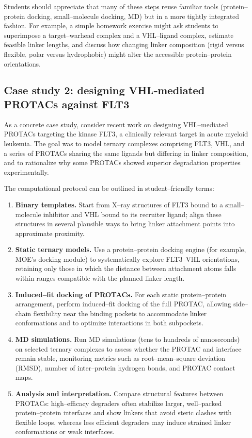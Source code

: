 \documentclass[12pt]{article}
\begin{document}
Students should appreciate that many of these steps reuse familiar tools (protein–protein docking, small–molecule docking, MD) but in a more tightly integrated fashion.  
For example, a simple homework exercise might ask students to superimpose a target–warhead complex and a VHL–ligand complex, estimate feasible linker lengths, and discuss how changing linker composition (rigid versus flexible, polar versus hydrophobic) might alter the accessible protein–protein orientations.

\subsection{Case study 2: designing VHL‐mediated PROTACs against FLT3}

As a concrete case study, consider recent work on designing VHL–mediated PROTACs targeting the kinase FLT3, a clinically relevant target in acute myeloid leukemia. 
The goal was to model ternary complexes comprising FLT3, VHL, and a series of PROTACs sharing the same ligands but differing in linker composition, and to rationalize why some PROTACs showed superior degradation properties experimentally.\cite{CH14_flt3protac2025} 

The computational protocol can be outlined in student–friendly terms:

\begin{enumerate}
  \item \textbf{Binary templates.} Start from X–ray structures of FLT3 bound to a small–molecule inhibitor and VHL bound to its recruiter ligand; align these structures in several plausible ways to bring linker attachment points into approximate proximity.  
  \item \textbf{Static ternary models.} Use a protein–protein docking engine (for example, MOE’s docking module) to systematically explore FLT3–VHL orientations, retaining only those in which the distance between attachment atoms falls within ranges compatible with the planned linker length.  
  \item \textbf{Induced–fit docking of PROTACs.} For each static protein–protein arrangement, perform induced–fit docking of the full PROTAC, allowing side–chain flexibility near the binding pockets to accommodate linker conformations and to optimize interactions in both subpockets.  
  \item \textbf{MD simulations.} Run MD simulations (tens to hundreds of nanoseconds) on selected ternary complexes to assess whether the PROTAC and interface remain stable, monitoring metrics such as root–mean–square deviation (RMSD), number of inter–protein hydrogen bonds, and PROTAC contact maps.  
  \item \textbf{Analysis and interpretation.} Compare structural features between PROTACs: high–efficacy degraders often stabilize larger, well–packed protein–protein interfaces and show linkers that avoid steric clashes with flexible loops, whereas less efficient degraders may induce strained linker conformations or weak interfaces.
\end{enumerate}
\end{document}
